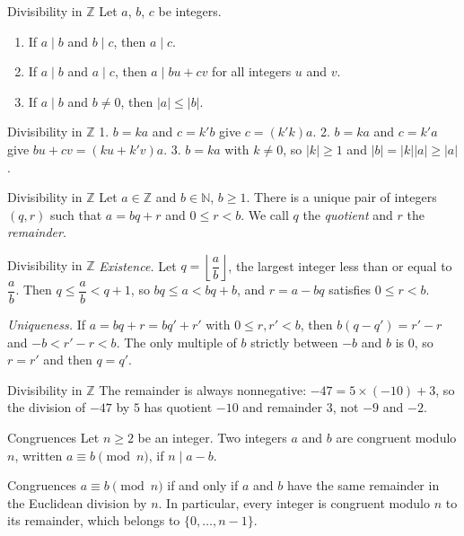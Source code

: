 \documentclass[aspectratio=169,10pt]{beamer}
\providecommand{\N}{\mathbb{N}}
\providecommand{\Z}{\mathbb{Z}}
\providecommand{\abs}[1]{\left\lvert #1\right\rvert}
\begin{document}
\begin{frame}{Divisibility in \(\Z\)}
Let \(a\), \(b\), \(c\) be integers.

\begin{enumerate}
\setcounter{enumi}{0}
\item If \(a\mid b\) and \(b\mid c\), then \(a\mid c\).

\item If \(a\mid b\) and \(a\mid c\), then \(a\mid bu+cv\) for all integers \(u\) and \(v\).

\item If \(a\mid b\) and \(b\neq0\), then \(\abs a\le\abs b\).

\end{enumerate}
\end{frame}
\begin{frame}{Divisibility in \(\Z\)}
1. \(b=ka\) and \(c=k'b\) give \(c=(k'k)a\). 2. \(b=ka\) and \(c=k'a\) give \(bu+cv=(ku+k'v)a\). 3. \(b=ka\) with \(k\neq0\), so \(\abs k\ge1\) and \(\abs b=\abs k\abs a\ge\abs a\).
\end{frame}
\begin{frame}{Divisibility in \(\Z\)}
Let \(a\in\Z\) and \(b\in\N\), \(b\ge1\). There is a unique pair of integers \((q,r)\) such that \(a=bq+r\) and \(0\le r<b\). We call \(q\) the \emph{quotient} and \(r\) the \emph{remainder}.
\end{frame}
\begin{frame}{Divisibility in \(\Z\)}
\emph{Existence.} Let \(q=\left\lfloor\dfrac ab\right\rfloor\), the largest integer less than or equal to \(\dfrac ab\). Then \(q\le\dfrac ab<q+1\), so \(bq\le a<bq+b\), and \(r=a-bq\) satisfies \(0\le r<b\).

\emph{Uniqueness.} If \(a=bq+r=bq'+r'\) with \(0\le r,r'<b\), then \(b(q-q')=r'-r\) and \(-b<r'-r<b\). The only multiple of \(b\) strictly between \(-b\) and \(b\) is \(0\), so \(r=r'\) and then \(q=q'\).
\end{frame}
\begin{frame}{Divisibility in \(\Z\)}
The remainder is always nonnegative: \(-47=5\times(-10)+3\), so the division of \(-47\) by \(5\) has quotient \(-10\) and remainder \(3\), not \(-9\) and \(-2\).
\end{frame}
\begin{frame}{Congruences}
Let \(n\ge2\) be an integer. Two integers \(a\) and \(b\) are congruent modulo \(n\), written \(a\equiv b\pmod n\), if \(n\mid a-b\).
\end{frame}
\begin{frame}{Congruences}
\(a\equiv b\pmod n\) if and only if \(a\) and \(b\) have the same remainder in the Euclidean division by \(n\). In particular, every integer is congruent modulo \(n\) to its remainder, which belongs to \(\{0,\ldots,n-1\}\).
\end{frame}
\end{document}
